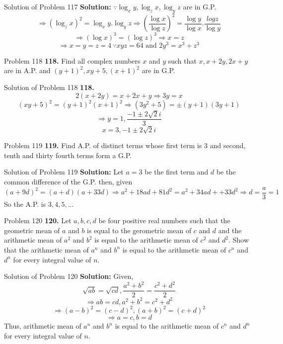 \documentclass[aspectratio=1610,8pt]{beamer}
\begin{document}
\begin{frame}{Solution of Problem 117}
  \textbf{Solution:} $\because \log_xy, \log_zx, \log_yz$ are in G.P.
  $$\Rightarrow (\log_zx)^2 = \log_xy.\log_yz \Rightarrow \left(\frac{\log x}{\log z}\right)^2 = \frac{\log y}{\log x}.\frac{log
    z}{\log y}$$
  $$\Rightarrow (\log x)^3 = (\log z)^3 \Rightarrow x = z$$
  $$\Rightarrow x = y = z = 4~\because xyz = 64\text{~and~}2y^3 = x^3 + z^3$$
\end{frame}
\begin{frame}{Problem 118}
  \textbf{118.} Find all complex numbers $x$ and $y$ such that $x, x + 2y, 2x + y$ are in A.P. and $(y + 1)^2, xy + 5, (x + 1)^2$
  are in G.P.
\end{frame}
\begin{frame}{Solution of Problem 118}
  \textbf{118.} $$2(x + 2y) = x + 2x + y \Rightarrow 3y = x$$
  $$(xy + 5)^2 = (y + 1)^2(x + 1)^2 \Rightarrow (3y^2 + 5) = \pm(y + 1)(3y + 1)$$
  $$\Rightarrow y = 1, \frac{-1\pm2\sqrt{2}i}{3}$$
  $$x = 3, -1\pm2\sqrt{2}i$$
\end{frame}
\begin{frame}{Problem 119}
  \textbf{119.} Find A.P. of distinct terms whose first term is $3$ and second, tenth and thirty fourth terms form a G.P.
\end{frame}
\begin{frame}{Solution of Problem 119}
  \textbf{Solution:} Let $a = 3$ be the first term and $d$ be the common difference of the G.P. then, given
  $$(a + 9d)^2 = (a + d)(a + 33d)\Rightarrow a^2 + 18ad + 81d^2 = a^2 + 34ad + + 33d^2 \Rightarrow d = \frac{a}{3} = 1$$
  So the A.P. is $3, 4, 5, \ldots$
\end{frame}
\begin{frame}{Problem 120}
  \textbf{120.} Let $a, b, c, d$ be four positive real numbers such that the geometric mean of $a$ and $b$ is equal to the
  gerometric mean of $c$ and $d$ and the arithmetic mean of $a^2$ and $b^2$ is equal to the arithmetic mean of $c^2$ and $d^2.$
  Show that the arithmetic mean of $a^n$ and $b^n$ is equal to the arithmetic mean of $c^n$ and $d^n$ for every integral value of
  $n.$
\end{frame}
\begin{frame}{Solution of Problem 120}
  \textbf{Solution:} Given, $$\sqrt{ab} = \sqrt{cd}, \frac{a^2 + b^2}{2} = \frac{c^2 + d^2}{2}$$
  $$\Rightarrow ab = cd, a^2 + b^2 = c^2 + d^2$$
  $$\Rightarrow (a - b)^2 = (c - d)^2, (a + b)^2 = (c + d)^2$$
  $$\Rightarrow a = c, b = d$$
  Thus, arithmetic mean of $a^n$ and $b^n$ is equal to the arithmetic mean of $c^n$ and $d^n$ for every integral value of
  $n.$
\end{frame}
\end{document}

